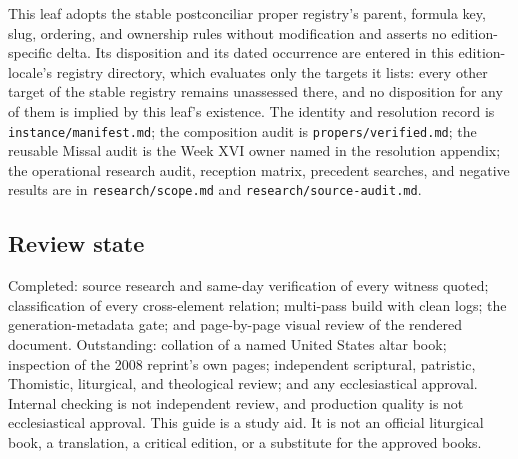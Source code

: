 This leaf adopts the stable postconciliar proper registry's parent, formula
key, slug, ordering, and ownership rules without modification and asserts no
edition-specific delta. Its disposition and its dated occurrence are entered in
this edition-locale's registry directory, which evaluates only the targets it
lists: every other target of the stable registry remains unassessed there, and
no disposition for any of them is implied by this leaf's existence. The
identity and resolution record is
\texttt{instance/manifest.md}; the composition audit is
\texttt{propers/verified.md}; the reusable Missal audit is the Week XVI owner
named in the resolution appendix; the operational research audit, reception
matrix, precedent searches, and negative results are in
\texttt{research/scope.md} and \texttt{research/source-audit.md}.

\subsection*{Review state}

Completed: source research and same-day verification of every witness quoted;
classification of every cross-element relation; multi-pass build with clean
logs; the generation-metadata gate; and page-by-page visual review of the
rendered document. Outstanding: collation of a named United States altar book;
inspection of the 2008 reprint's own pages; independent scriptural, patristic,
Thomistic, liturgical, and theological review; and any ecclesiastical
approval. Internal checking is not independent review, and production quality
is not ecclesiastical approval. This guide is a study aid. It is not an
official liturgical book, a translation, a critical edition, or a substitute
for the approved books.
